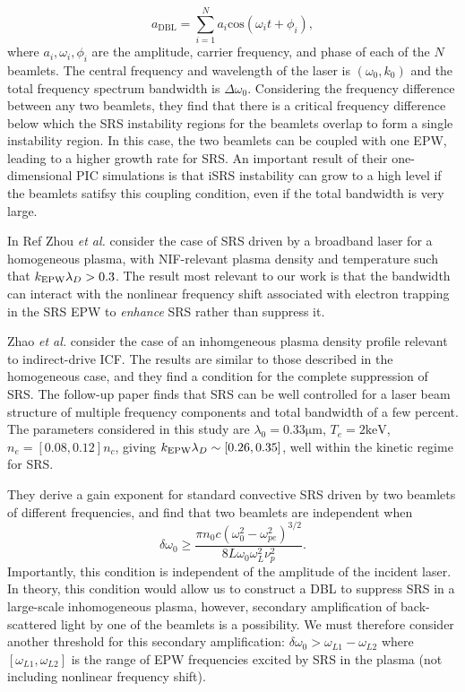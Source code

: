 \begin{equation}\label{eqn:DBL}
  a_{\mathrm{DBL}} = \sum_{i=1}^{N} a_i \mathrm{cos}(\omega_it + \phi_i),
\end{equation}
where $a_i,\omega_i,\phi_i$ are the amplitude, carrier frequency, and phase of
each of the $N$ beamlets. The central frequency and wavelength of the laser is
$(\omega_0,k_0)$ and the total frequency spectrum bandwidth is
$\Delta\omega_0$.
Considering the frequency difference between any two beamlets, they find that
there is a critical frequency difference below which the SRS instability regions
for the beamlets overlap to form a single instability region. In this case, the
two beamlets can be coupled with one EPW, leading to a higher growth rate for
SRS. An important result of their one-dimensional PIC simulations is that iSRS
instability can grow to a high level if the beamlets satifsy this coupling
condition, even if the total bandwidth is very large.


In Ref \cite{zhou_kinetic_2018} Zhou \textit{et al.} consider the case of SRS
driven by a broadband laser for a homogeneous plasma, with NIF-relevant plasma
density and temperature such that $k_\mathrm{EPW}\lambda_D > 0.3$. The result most relevant to our
work is that the bandwidth can interact with the nonlinear frequency shift associated
with electron trapping in the SRS EPW to \emph{enhance} SRS rather than suppress it.



Zhao \textit{et al.} \cite{zhao_effective_2017} consider the case of an
inhomgeneous plasma density profile relevant to indirect-drive ICF. The results
are similar to those described in the homogeneous case, and they find a
condition for the complete suppression of SRS. The follow-up paper
\cite{zhao_suppression_2019} finds that SRS can be well controlled for a laser
beam structure of multiple frequency components and total bandwidth of a few
percent. The parameters considered in this study are
$\lambda_0=0.33\si{\micro\metre}$,
$T_e=2\si{\kilo\electronvolt}$, $n_e = [0.08,0.12]n_c$, giving $k_\mathrm{EPW}\lambda_D \sim
[0.26,0.35]$, well within the kinetic regime for SRS.

They derive a gain exponent for standard convective SRS driven by two
beamlets of different frequencies, and find that two beamlets are independent
when
\begin{equation}\label{DLB_threshold_inhomo}
\delta \omega_{0} \geq \frac{\pi n_{0} c\left(\omega_{0}^{2}-\omega_{p
e}^{2}\right)^{3 / 2}}{8 L \omega_{0} \omega_{L}^{2} \nu_{p}^{2}}.
\end{equation}
Importantly, this condition is independent of the amplitude of the incident
laser. In theory, this condition would allow us to construct a DBL to suppress
SRS in a large-scale inhomogeneous plasma, however, secondary amplification of
back-scattered light by one of the beamlets is a possibility. We must therefore
consider another threshold for this secondary amplification: $\delta\omega_0 >
\omega_{L1}-\omega_{L2}$ where $[\omega_{L1},\omega_{L2}]$ is the range of EPW
frequencies excited by SRS in the plasma (not including nonlinear frequency
shift).


